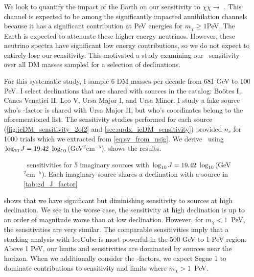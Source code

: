 We look to quantify the impact of the Earth on our sensitivity to $\chi\chi \rightarrow$ \parpar{\nu_\mu}.
This channel is expected to be among the significantly impacted annihilation channels because it has a significant contribution at PeV energies for $m_\chi \ge 1$PeV.
The Earth is expected to attenuate these higher energy neutrinos.
However, these neutrino spectra have significant low energy contributions, so we do not expect to entirely lose our sensitivity.
This motivated a study examining our \sv~sensitivity over all DM masses sampled for a selection of declinations.

For this systematic study, I sample 6 DM masses per decade from 681 GeV to 100 PeV.
I select declinations that are shared with sources in the \GS catalog: Boötes I, Canes Venatici II, Leo V, Ursa Major I, and Ursa Minor.
I study a fake source who's \J-factor is shared with Ursa Major II, but who's coordinates belong to the aforementioned list.
The sensitivity studies performed for each source (\cref{fig:icDM_sensitivity_2of2} and \cref{sec:apdx_icDM_sensitivity}) provided $n_s$ for 1000 trials which we extracted from \cref{eq:sv_from_nsig}.
We derive \sv~using $\log_{10}J = 19.42~\log_{10}$(GeV$^2$cm$^{-5}$).
 shows the results.

\begin{figure}
    \caption{\sv~sensitivities for 5 imaginary sources with $\log_{10}J = 19.42~\log_{10}$(GeV$^2$cm$^{-5}$). Each imaginary source shares a declination with a source in \cref{tab:gd_J_factor}}
    \label{fig:icDM_dec_study}
\end{figure}

 shows that we have significant but diminishing sensitivity to sources at high declination.
We see in the worse case, the sensitivity at high declination is up to an order of magnitude worse than at low declination.
However, for $m_\chi < 1$~PeV, the sensitivities are very similar.
The comparable sensitivities imply that a stacking analysis with IceCube is most powerful in the 500 GeV to 1 PeV region.
Above 1 PeV, our limits and sensitivities are dominated by sources near the horizon.
When we additionally consider the \J-factors, we expect Segue 1 to dominate contributions to sensitivity and limits where $m_\chi > 1$~PeV.

